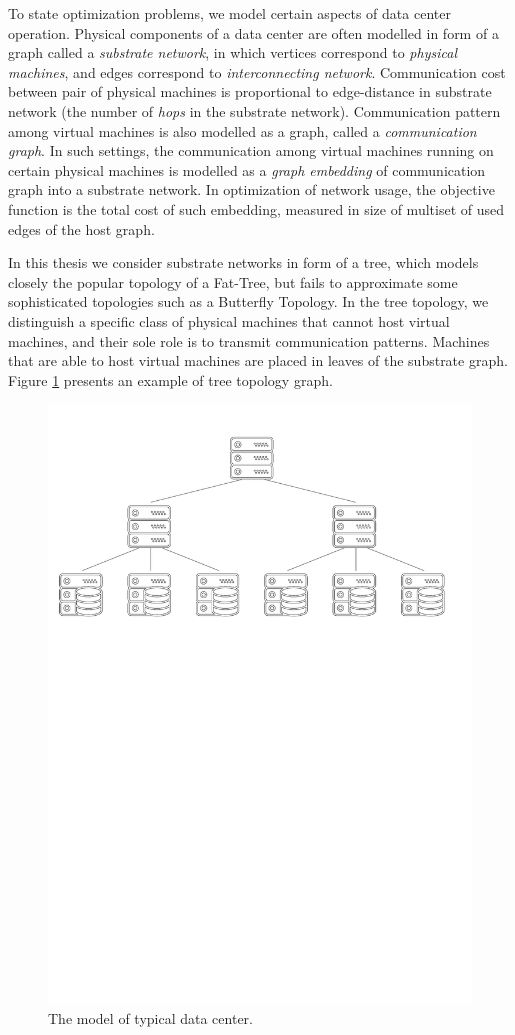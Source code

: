 To state optimization problems, we model certain aspects of data center operation.
Physical components of a data center are often modelled in form of a graph called a \emph{substrate network}, in which vertices correspond to \emph{physical machines}, and edges correspond to \emph{interconnecting network}.
Communication cost between pair of physical machines is proportional to edge-distance in substrate network (the number of \emph{hops} in the substrate network).
Communication pattern among virtual machines is also modelled as a graph, called a \emph{communication graph}.
In such settings, the communication among virtual machines running on certain physical machines is modelled as a \emph{graph embedding} of communication graph into a substrate network.
In optimization of network usage, the objective function is the total cost of such embedding, measured in size of multiset of used edges of the host graph.

In this thesis we consider substrate networks in form of a tree, which models closely the popular topology of a Fat-Tree, but fails to approximate some sophisticated topologies such as a Butterfly Topology.
In the tree topology, we distinguish a specific class of physical machines that cannot host virtual machines, and their sole role is to transmit communication patterns.
Machines that are able to host virtual machines are placed in leaves of the substrate graph.
Figure \ref{fig:tree-topology} presents an example of tree topology graph.


\begin{figure}[th]
\centering
\includegraphics[width=0.79\columnwidth]{figs/tree-topology.pdf}
\caption{The model of typical data center.}\label{fig:tree-topology}
\vspace{-1em}
\end{figure}

